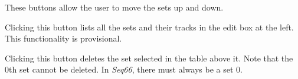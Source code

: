    These buttons allow the user to move the sets up and down.

   Clicking this button lists all the sets and their tracks in the edit box at
   the left. This functionality is provisional.

   Clicking this button deletes the set selected in the table above it.
   Note that the 0th set cannot be deleted.
   In \textsl{Seq66}, there must always be a set 0.

